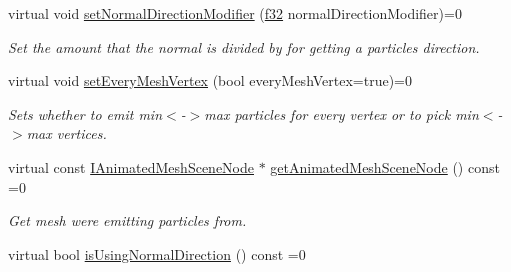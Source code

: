 \begin{DoxyCompactItemize}
\mbox{\label{classirr_1_1scene_1_1IParticleAnimatedMeshSceneNodeEmitter_a0f7da6d0e149de9169091b3a144632e8}} 
virtual void \hyperlink{classirr_1_1scene_1_1IParticleAnimatedMeshSceneNodeEmitter_a0f7da6d0e149de9169091b3a144632e8}{set\+Normal\+Direction\+Modifier} (\hyperlink{namespaceirr_a0277be98d67dc26ff93b1a6a1d086b07}{f32} normal\+Direction\+Modifier)=0
\begin{DoxyCompactList}\small\item\em Set the amount that the normal is divided by for getting a particles direction. \end{DoxyCompactList}\item 
\mbox{\label{classirr_1_1scene_1_1IParticleAnimatedMeshSceneNodeEmitter_adfb1ff0bef8f6a86be81f928f5d27784}} 
virtual void \hyperlink{classirr_1_1scene_1_1IParticleAnimatedMeshSceneNodeEmitter_adfb1ff0bef8f6a86be81f928f5d27784}{set\+Every\+Mesh\+Vertex} (bool every\+Mesh\+Vertex=true)=0
\begin{DoxyCompactList}\small\item\em Sets whether to emit min$<$-\/$>$max particles for every vertex or to pick min$<$-\/$>$max vertices. \end{DoxyCompactList}\item 
\mbox{\label{classirr_1_1scene_1_1IParticleAnimatedMeshSceneNodeEmitter_a7db412dd66d33b05074b59005798fc00}} 
virtual const \hyperlink{classirr_1_1scene_1_1IAnimatedMeshSceneNode}{I\+Animated\+Mesh\+Scene\+Node} $\ast$ \hyperlink{classirr_1_1scene_1_1IParticleAnimatedMeshSceneNodeEmitter_a7db412dd66d33b05074b59005798fc00}{get\+Animated\+Mesh\+Scene\+Node} () const =0
\begin{DoxyCompactList}\small\item\em Get mesh we\textquotesingle{}re emitting particles from. \end{DoxyCompactList}\item 
\mbox{\label{classirr_1_1scene_1_1IParticleAnimatedMeshSceneNodeEmitter_aa72ac0294ad9b01710e5e935c77a8191}} 
virtual bool \hyperlink{classirr_1_1scene_1_1IParticleAnimatedMeshSceneNodeEmitter_aa72ac0294ad9b01710e5e935c77a8191}{is\+Using\+Normal\+Direction} () const =0

\end{DoxyCompactItemize}
